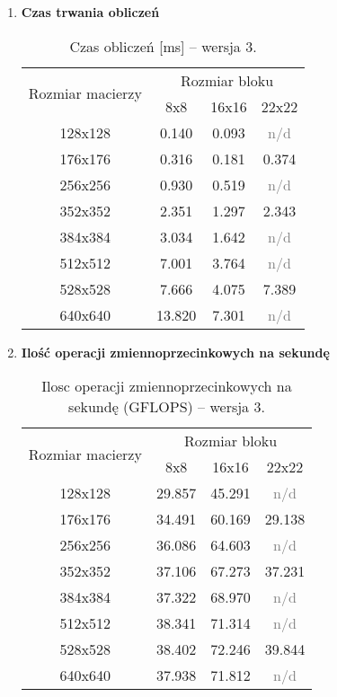 \begin{enumerate}

\item \textbf{Czas trwania obliczeń} \newline

\begin{table}[H]
\centering
\begin{tabular}{|c|c|c|c|}
\hline
\multirow{2}{*}{Rozmiar macierzy} & \multicolumn{3}{c|}{Rozmiar bloku} \\ \cline{2-4}
& 8x8 & 16x16 & 22x22 \\ \hline
128x128 & 0.140 & 0.093 & \textcolor{gray}{n/d} \\ \hline
176x176 & 0.316 & 0.181 & 0.374 \\ \hline
256x256 & 0.930 & 0.519 & \textcolor{gray}{n/d} \\ \hline
352x352 & 2.351 & 1.297 & 2.343 \\ \hline
384x384 & 3.034 & 1.642 & \textcolor{gray}{n/d} \\ \hline
512x512 & 7.001 & 3.764 & \textcolor{gray}{n/d} \\ \hline
528x528 & 7.666 & 4.075 & 7.389 \\ \hline
640x640 & 13.820 & 7.301 & \textcolor{gray}{n/d} \\ \hline
\end{tabular}
\caption{Czas obliczeń [ms] -- wersja 3.}
\end{table}

\item \textbf{Ilość operacji zmiennoprzecinkowych na sekundę} \newline

\begin{table}[H]
\centering
\begin{tabular}{|c|c|c|c|}
\hline
\multirow{2}{*}{Rozmiar macierzy} & \multicolumn{3}{c|}{Rozmiar bloku} \\ \cline{2-4}
& 8x8 & 16x16 & 22x22 \\ \hline
128x128 & 29.857 & 45.291 & \textcolor{gray}{n/d}\\ \hline
176x176 & 34.491 & 60.169 & 29.138 \\ \hline
256x256 & 36.086 & 64.603 & \textcolor{gray}{n/d} \\ \hline
352x352 & 37.106 & 67.273 & 37.231 \\ \hline
384x384 & 37.322 & 68.970 & \textcolor{gray}{n/d} \\ \hline
512x512 & 38.341 & 71.314 & \textcolor{gray}{n/d} \\ \hline
528x528 & 38.402 & 72.246 & 39.844 \\ \hline
640x640 & 37.938 & 71.812 & \textcolor{gray}{n/d} \\ \hline
\end{tabular}
\caption{Ilosc operacji zmiennoprzecinkowych na sekundę (GFLOPS) -- wersja 3.}
\end{table}


\end{enumerate}

